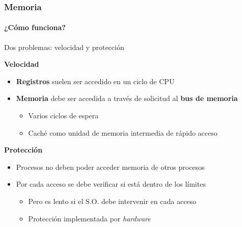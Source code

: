 \documentclass[letter]{beamer}
\begin{document}
\begin{frame}
  \frametitle{Memoria}
  \framesubtitle{¿Cómo funciona?}

  Dos problemas: velocidad y protección
  
  {\bf Velocidad}
  
  \begin{itemize}
    \item {\bf Registros} suelen ser accedido en un ciclo de CPU
    \item {\bf Memoria} debe ser accedida a través de solicitud al {\bf bus de memoria}
      \begin{itemize}
        \item Varios ciclos de espera
        \item Caché como unidad de memoria intermedia de rápido acceso
      \end{itemize}
  \end{itemize}

  {\bf Protección}
  
  \begin{itemize}
    \item Procesos no deben poder acceder memoria de otros procesos
    \item Por cada acceso se debe verificar si está dentro de los límites
      \begin{itemize}
        \item Pero es lento si el S.O. debe intervenir en cada acceso
        \item Protección implementada por {\em hardware}
      \end{itemize}
  \end{itemize}
  

\end{frame}
\end{document}
